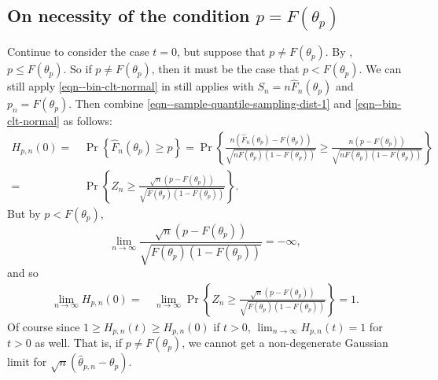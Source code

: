 \subsection{On necessity of the condition \texorpdfstring{\(p = F \left(
\theta_{p} \right)\)}{p = F (theta p)}}

Continue to consider the case \(t = 0\), but suppose that \(p \neq F \left(
\theta_{p} \right)\).
By , \(p \leq F \left( \theta_{p} \right)\).
So if \(p \neq F \left( \theta_{p} \right)\), then it must be the case that
\(p < F \left( \theta_{p} \right)\).
We can still apply \eqref{eqn--bin-clt-normal} in 
still applies with \(S_{n} = n \widehat{F}_{n} \left( \theta_{p} \right)\)
and \(p_{n} = F \left( \theta_{p} \right)\).
Then combine \eqref{eqn--sample-quantile-sampling-dist-1} and
\eqref{eqn--bin-clt-normal} as follows:
\begin{align*}
  H_{p, n} (0) =
  & \, \Pr \left\{ \widehat{F}_{n} \left( \theta_{p} \right) \geq p
  \right\} = \Pr \left\{ \frac{n \left( \widehat{F}_{n} \left( \theta_{p}
  \right) - F \left( \theta_{p} \right) \right)}{\sqrt{n F \left( \theta_{p}
  \right) \left( 1 - F \left( \theta_{p} \right) \right)}} \geq \frac{n \left( p
  - F \left( \theta_{p} \right) \right)}{\sqrt{n F \left( \theta_{p} \right)
  \left( 1 - F \left( \theta_{p} \right) \right)}} \right\} \\
  =
  & \, \Pr \left\{ Z_{n} \geq \frac{\sqrt{n} \left( p - F \left( \theta_{p}
  \right) \right)}{\sqrt{F \left( \theta_{p} \right) \left( 1 - F \left(
  \theta_{p} \right) \right)}} \right\}.
\end{align*}
But by \(p < F \left( \theta_{p} \right)\),
\begin{equation*}
  \lim_{n \to \infty} \frac{\sqrt{n} \left( p - F \left( \theta_{p}
  \right) \right)}{\sqrt{F \left( \theta_{p} \right) \left( 1 - F \left(
  \theta_{p} \right) \right)}} = - \infty,
\end{equation*}
and so
\begin{align*}
  \lim_{n \to \infty} H_{p, n} (0) =
  & \, \lim_{n \to \infty} \Pr \left\{ Z_{n} \geq \frac{\sqrt{n} \left( p - F
  \left( \theta_{p} \right) \right)}{\sqrt{F \left( \theta_{p} \right) \left( 1
  - F \left( \theta_{p} \right) \right)}} \right\} = 1.
\end{align*}
Of course since \(1 \geq H_{p, n} (t) \geq H_{p, n} (0)\) if \(t > 0\),
\(\lim_{n \to \infty} H_{p, n} (t) = 1\) for \(t > 0\) as well.
That is, if \(p \neq F \left( \theta_{p} \right)\), we cannot get a
non-degenerate Gaussian limit for \(\sqrt{n} \left( \widehat{\theta}_{p, n} -
\theta_{p} \right)\).

